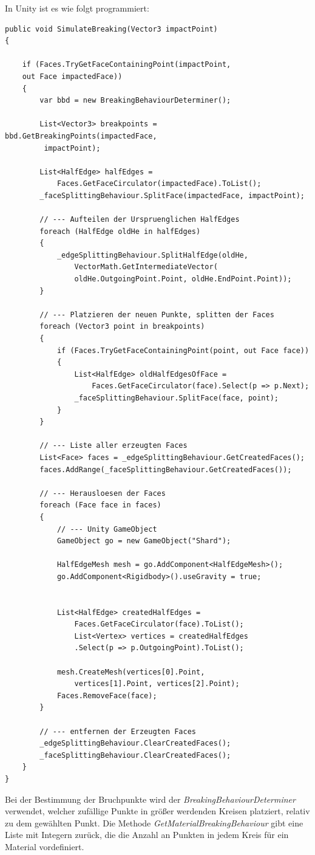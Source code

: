 In Unity ist es wie folgt programmiert:
\begin{lstlisting}
public void SimulateBreaking(Vector3 impactPoint)
{

	if (Faces.TryGetFaceContainingPoint(impactPoint, 
	out Face impactedFace))
	{
		var bbd = new BreakingBehaviourDeterminer();

		List<Vector3> breakpoints = bbd.GetBreakingPoints(impactedFace,
		 impactPoint);
		 
		List<HalfEdge> halfEdges =
			Faces.GetFaceCirculator(impactedFace).ToList();
		_faceSplittingBehaviour.SplitFace(impactedFace, impactPoint);

		// --- Aufteilen der Urspruenglichen HalfEdges
		foreach (HalfEdge oldHe in halfEdges)
		{
			_edgeSplittingBehaviour.SplitHalfEdge(oldHe,
				VectorMath.GetIntermediateVector(
				oldHe.OutgoingPoint.Point, oldHe.EndPoint.Point));
		}

		// --- Platzieren der neuen Punkte, splitten der Faces
		foreach (Vector3 point in breakpoints)
		{
			if (Faces.TryGetFaceContainingPoint(point, out Face face))
			{
				List<HalfEdge> oldHalfEdgesOfFace = 
					Faces.GetFaceCirculator(face).Select(p => p.Next);
				_faceSplittingBehaviour.SplitFace(face, point);
			}
		}
	
		// --- Liste aller erzeugten Faces
		List<Face> faces = _edgeSplittingBehaviour.GetCreatedFaces();
		faces.AddRange(_faceSplittingBehaviour.GetCreatedFaces());
	
		// --- Herausloesen der Faces
		foreach (Face face in faces)
		{
			// --- Unity GameObject
			GameObject go = new GameObject("Shard");
	
			HalfEdgeMesh mesh = go.AddComponent<HalfEdgeMesh>();
			go.AddComponent<Rigidbody>().useGravity = true;
	
	
			List<HalfEdge> createdHalfEdges = 
				Faces.GetFaceCirculator(face).ToList();
				List<Vertex> vertices = createdHalfEdges
				.Select(p => p.OutgoingPoint).ToList();
	
			mesh.CreateMesh(vertices[0].Point, 
				vertices[1].Point, vertices[2].Point);
			Faces.RemoveFace(face);
		}
		
		// --- entfernen der Erzeugten Faces
		_edgeSplittingBehaviour.ClearCreatedFaces();
		_faceSplittingBehaviour.ClearCreatedFaces();
	}
}
\end{lstlisting}
Bei der Bestimmung der Bruchpunkte wird der \textit{BreakingBehaviourDeterminer} verwendet, welcher zuf\"allige Punkte in gr\"o{\ss}er werdenden Kreisen platziert, relativ zu dem gew\"ahlten Punkt. Die Methode \textit{GetMaterialBreakingBehaviour} gibt eine Liste mit Integern zur\"uck, die die Anzahl an Punkten in jedem Kreis f\"ur ein Material vordefiniert.

